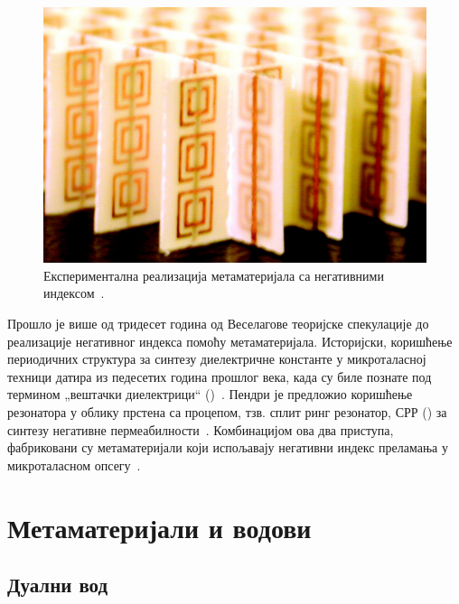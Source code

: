 \documentclass[main.tex]{subfiles}
\begin{document}
\begin{figure}[h]
    \centering
    \includegraphics[width=0.8\linewidth]{sl_uvod/mm_smit.jpg}
    \caption{Експериментална реализација метаматеријала са негативними индексом~\cite{smith:00}.}
    \label{uvod:mm_smit}
\end{figure}
Прошло је више од тридесет година од Веселагове теоријске спекулације до реализације негативног индекса помоћу метаматеријала. Историјски, коришћење периодичних структура за синтезу диелектричне константе у микроталасној техници датира из педесетих година прошлог века, када су биле познате под термином „вештачки диелектрици`` ()~\cite{rotman1962plasma}. Пендри је предложио коришћење резонатора у облику прстена са процепом, тзв. сплит ринг резонатор, СРР () за синтезу негативне пермеабилности~\cite{pendri:99}. Комбинацијом ова два приступа, фабриковани су метаматеријали који испољавају негативни индекс преламања у микроталасном опсегу~\cite{smith:00}.
%

\section{Метаматеријали и водови}

\subsection{Дуални вод}
\end{document}
